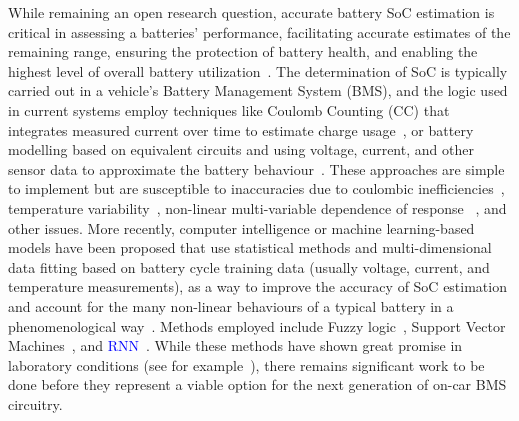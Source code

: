 %
%
While remaining an open research question, accurate battery SoC estimation is critical in assessing a batteries' performance, facilitating accurate estimates of the remaining range, ensuring the protection of battery health, and enabling the highest level of overall battery utilization~\cite{yamin_embedded_2014}.
The determination of SoC is typically carried out in a vehicle's Battery Management System (BMS), and the logic used in current systems employ techniques like Coulomb Counting (CC) that integrates measured current over time to estimate charge usage~\cite{robust_SoC}, or battery modelling based on equivalent circuits and using voltage, current, and other sensor data to approximate the battery behaviour~\cite{6953745,ng_enhanced_2009,robust_SoC}.
These approaches are simple to implement but are susceptible to inaccuracies due to coulombic inefficiencies~\cite{Smith_2010}, temperature variability~\cite{xing_state_2014}, non-linear multi-variable dependence of response ~\cite{hansen_support_2005,anton_battery_2013,he_state_2014}, and other issues.
More recently, computer intelligence or machine learning-based models have been proposed that use statistical methods and multi-dimensional data fitting based on battery cycle training data (usually voltage, current, and temperature measurements), as a way to improve the accuracy of SoC estimation and account for the many non-linear behaviours of a typical battery in a phenomenological way~\cite{hansen_support_2005,anton_battery_2013,he_state_2014}.
Methods employed include Fuzzy logic~\cite{malkhandi_fuzzy_2006}, Support Vector Machines~\cite{hansen_support_2005, anton_battery_2013}, and \textcolor{blue}{RNN}~\cite{song_lithium-ion_2018,Chemali2017,mamo_long_2020,jiao_gru-rnn_2020,xiao_accurate_2019,javid_adaptive_2020,zhang_deep_2020}.
While these methods have shown great promise in laboratory conditions (see for example~\cite{jiao_gru-rnn_2020}), there remains significant work to be done before they represent a viable option for the next generation of on-car BMS circuitry.

